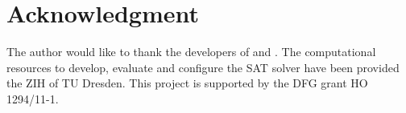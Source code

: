 \documentclass[conference]{IEEEtran}
\begin{document}
\section*{Acknowledgment}
The author would like to thank the developers of \glucose and \minisat. 
The computational resources to develop, evaluate and configure the SAT solver have been provided the ZIH of TU Dresden. 
This project is supported by the DFG grant HO 1294/11-1. 

% 


\end{document}
